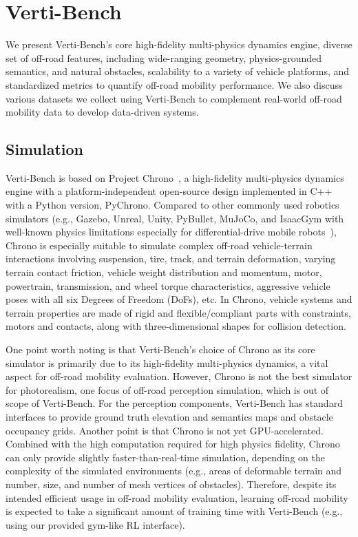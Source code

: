 \section{Verti-Bench}
\label{sec::approach}

We present Verti-Bench's core high-fidelity multi-physics dynamics engine, diverse set of off-road features, including wide-ranging geometry, physics-grounded semantics, and natural obstacles, scalability to a variety of vehicle platforms, and standardized metrics to quantify off-road mobility performance. We also discuss various datasets we collect using Verti-Bench to complement real-world off-road mobility data to develop data-driven systems.

\subsection{Simulation}
Verti-Bench is based on Project Chrono~\cite{tasora2016chrono}, a high-fidelity multi-physics dynamics engine with a platform-independent open-source design implemented in C++ with a Python version, PyChrono. Compared to other commonly used robotics simulators (e.g., Gazebo, Unreal, Unity, PyBullet, MuJoCo, and IsaacGym with well-known physics limitations especially for differential-drive mobile robots~\cite{zifan_isaac}), Chrono is especially suitable to simulate complex off-road vehicle-terrain interactions involving suspension, tire, track, and terrain deformation, varying terrain contact friction, vehicle weight distribution and momentum, motor, powertrain, transmission, and wheel torque characteristics, aggressive vehicle poses with all six Degrees of Freedom (DoFs), etc. 
In Chrono, vehicle systems and terrain properties are made of rigid and flexible/compliant parts with constraints, motors and contacts, along with three-dimensional shapes for collision detection. 

One point worth noting is that Verti-Bench's choice of Chrono as its core simulator is primarily due to its high-fidelity multi-physics dynamics, a vital aspect for off-road mobility evaluation. However, Chrono is not the best simulator for photorealism, one focus of off-road perception simulation, which is out of scope of Verti-Bench. For the perception components, Verti-Bench has standard interfaces to provide ground truth elevation and semantics maps and obstacle occupancy grids. Another point is that Chrono is not yet GPU-accelerated. Combined with the high computation required for high physics fidelity, Chrono can only provide slightly faster-than-real-time simulation, depending on the complexity of the simulated environments (e.g., areas of deformable terrain and number, size, and number of mesh vertices of obstacles). Therefore, despite its intended efficient usage in off-road mobility evaluation, learning off-road mobility is expected to take a significant amount of training time with Verti-Bench (e.g., using our provided gym-like RL interface). 

